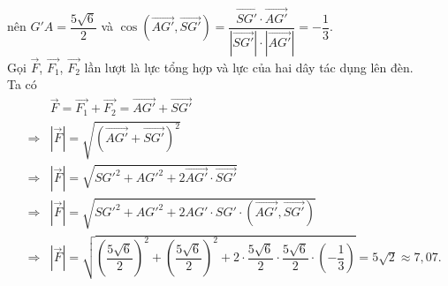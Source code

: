 \begin{bt}
{\begin{eqnarray*}
			\end{eqnarray*} 
		nên $G'A=\dfrac{5\sqrt{6}}{2}$ và $\cos\left(\overrightarrow{AG'}, \overrightarrow{SG'}\right)=\dfrac{\overrightarrow{SG'}\cdot\overrightarrow{AG'}}{\left|\overrightarrow{SG'}\right|\cdot\left|\overrightarrow{AG'}\right|}=-\dfrac{1}{3}.$\\
		Gọi $\overrightarrow{F}$, $\overrightarrow{F_1}$, $\overrightarrow{F_2}$ lần lượt là lực tổng hợp và lực của hai dây tác dụng lên đèn.\\
		Ta có 
		\begin{eqnarray*}
	&&\overrightarrow{F}=\overrightarrow{F_1}+\overrightarrow{F_2}=\overrightarrow{AG'}+\overrightarrow{SG'}\\
	& \Rightarrow& \left|\overrightarrow{F}\right|=\sqrt{\left(\overrightarrow{AG'}+\overrightarrow{SG'}\right)^2}\\
	& \Rightarrow & \left|\overrightarrow{F}\right|=\sqrt{SG'^2+AG'^2+2\overrightarrow{AG'}\cdot\overrightarrow{SG'}}\\
	& \Rightarrow &\left|\overrightarrow{F}\right|=\sqrt{SG'^2+AG'^2+2AG'\cdot SG'\cdot\left(\overrightarrow{AG'},\overrightarrow{SG'}\right)}\\
	& \Rightarrow &\left|\overrightarrow{F}\right|=\sqrt{\left(\dfrac{5\sqrt{6}}{2}\right)^2+\left(\dfrac{5\sqrt{6}}{2}\right)^2+2\cdot \dfrac{5\sqrt{6}}{2}\cdot \dfrac{5\sqrt{6}}{2}\cdot\left(-\dfrac{1}{3}\right)}=5\sqrt{2} \approx 7{,}07.
%			
		\end{eqnarray*}
		}
\end{bt}

